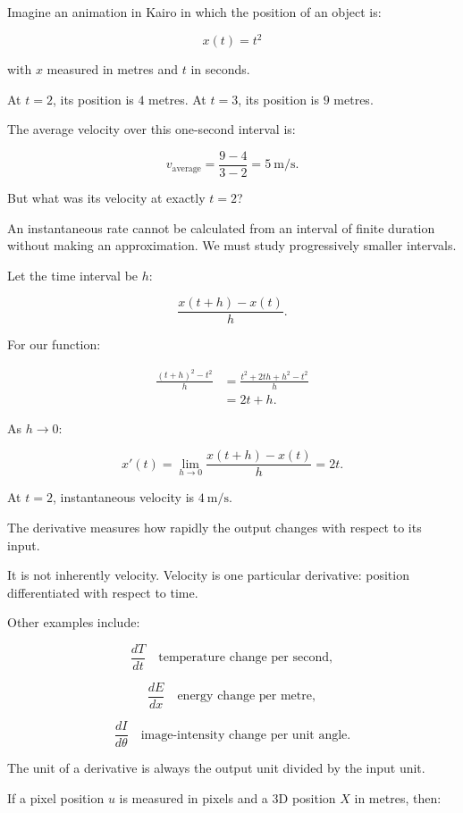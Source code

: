 \hypertarget{01-foundations-i-ch020-the-derivative-as-an-instantaneous-rate}{}

Imagine an animation in Kairo in which the position of an object is:

\[
x(t)=t^2
\]

with \(x\) measured in metres and \(t\) in seconds.

At \(t=2\), its position is \(4\) metres. At \(t=3\), its position is \(9\) metres.

The average velocity over this one-second interval is:

\[
v_{\text{average}}=\frac{9-4}{3-2}=5\ \text{m/s}.
\]

But what was its velocity at exactly \(t=2\)?

An instantaneous rate cannot be calculated from an interval of finite duration without making an approximation. We must study progressively smaller intervals.

Let the time interval be \(h\):

\[
\frac{x(t+h)-x(t)}{h}.
\]

For our function:

\[
\begin{aligned} \frac{(t+h)^2-t^2}{h} &=\frac{t^2+2th+h^2-t^2}{h}\\ &=2t+h. \end{aligned}
\]

As \(h\to0\):

\[
\boxed{x'(t)=\lim_{h\to0}\frac{x(t+h)-x(t)}h=2t}.
\]

At \(t=2\), instantaneous velocity is \(4\ \text{m/s}\).

The derivative measures how rapidly the output changes with respect to its input.

It is not inherently velocity. Velocity is one particular derivative: position differentiated with respect to time.

Other examples include:

\[
\frac{dT}{dt} \quad\text{temperature change per second},
\]

\[
\frac{dE}{dx} \quad\text{energy change per metre},
\]

\[
\frac{dI}{d\theta} \quad\text{image-intensity change per unit angle}.
\]

The unit of a derivative is always the output unit divided by the input unit.

If a pixel position \(u\) is measured in pixels and a 3D position \(X\) in metres, then:

